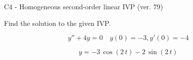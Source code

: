 \begin{exercise}
  \begin{exerciseTitle}C4 - Homogeneous second-order linear IVP (ver. 79)\end{exerciseTitle}
  \begin{exerciseStatement}
    
Find the solution to the given IVP.

    
\[y''+4y = 0 \hspace{1em} y(0) = -3 , y'(0) = -4\]

  \end{exerciseStatement}
  \begin{exerciseAnswer}
    
\[y= -3 \, \cos\left(2 \, t\right) - 2 \, \sin\left(2 \, t\right)\]

  \end{exerciseAnswer}
\end{exercise}